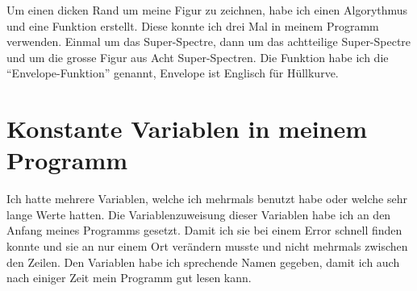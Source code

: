 \documentclass[a4paper]{article} %
\begin{document}
     Um einen dicken Rand um meine Figur zu zeichnen, habe ich einen Algorythmus und eine Funktion erstellt. Diese konnte ich drei Mal in meinem Programm verwenden.
     Einmal um das Super-Spectre, dann um das achtteilige Super-Spectre und um die grosse Figur aus Acht Super-Spectren.
     Die Funktion habe ich die ``Envelope-Funktion'' genannt, Envelope ist Englisch für Hüllkurve.

    \section{Konstante Variablen in meinem Programm} %

     Ich hatte mehrere Variablen, welche ich mehrmals benutzt habe oder welche sehr lange Werte hatten. Die Variablenzuweisung dieser Variablen habe ich an den Anfang meines Programms gesetzt.
     Damit ich sie bei einem Error schnell finden konnte und sie an nur einem Ort verändern musste und nicht mehrmals zwischen den Zeilen.
     Den Variablen habe ich sprechende Namen gegeben, damit ich auch nach einiger Zeit mein Programm gut lesen kann.

     
\end{document}
